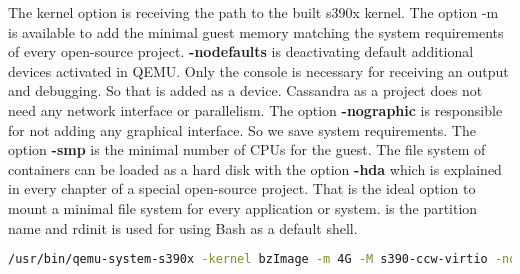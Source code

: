 The kernel option is receiving the path to the built s390x kernel. 
The option -m is available to add the minimal guest memory matching the system requirements of every open-source project. 
\textbf{-nodefaults} is deactivating default additional devices activated in QEMU. 
Only the console is necessary for receiving an output and debugging. 
So that is added as a device. Cassandra as a project does not need any network interface or parallelism. The 
option \textbf{-nographic} is responsible for not adding any graphical interface. 
So we save system requirements. The option \textbf{-smp} is the minimal number of CPUs for the guest. 
The file system of containers can be loaded as a hard disk with the option \textbf{-hda} which is explained in every chapter of a special open-source project. 
That is the ideal option to mount a minimal file system for every application or system. 
 is the partition name and rdinit is used for using Bash as a default shell. \\


\begin{lstlisting}[language=bash,caption={Optimized QEMU Command},captionpos=b]
/usr/bin/qemu-system-s390x -kernel bzImage -m 4G -M s390-ccw-virtio -nodefaults -device sclpconsole,chardev=console -parallel none -net none -chardev stdio,id=console,signal=off,mux=on -mon chardev=console -nographic -smp 3 -hda /data/kub-container.img --append 'root=/dev/vda rw console=ttyS0 rdinit=/bin/bash'
\end{lstlisting}

